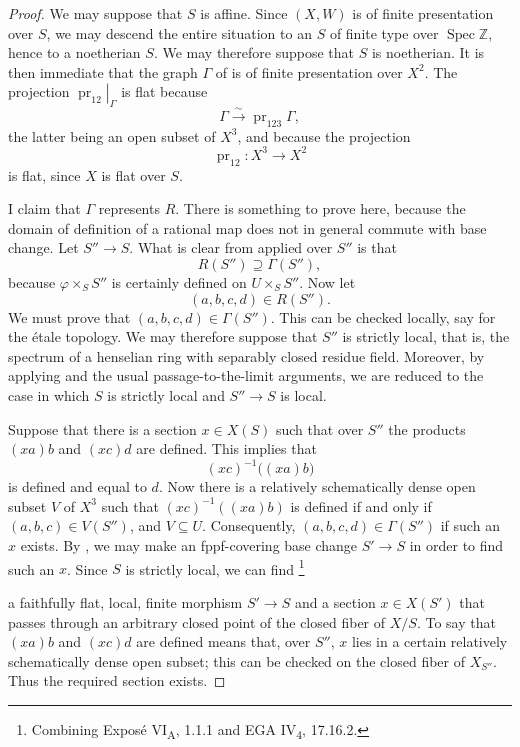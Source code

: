 \begin{proof}
We may suppose that \(S\) is affine. Since \((X,W)\) is of finite
presentation over \(S\), we may descend the entire situation to an
\(S\) of finite type over \(\operatorname{Spec}\mathbb Z\), hence
to a noetherian \(S\). We may therefore suppose that \(S\) is
noetherian. It is then immediate that the graph \(\Gamma\) of
 is of finite presentation over \(X^2\). The projection
\(\left.\operatorname{pr}_{12}\right|_\Gamma\) is flat because
\[
  \Gamma\xrightarrow{\sim}\operatorname{pr}_{123}\Gamma,
\]
the latter being an open subset of \(X^3\), and because the
projection
\[
  \operatorname{pr}_{12}\colon X^3\longrightarrow X^2
\]
is flat, since \(X\) is flat over \(S\).

I claim that \(\Gamma\) represents \(R\). There is something to
prove here, because the domain of definition of a rational map
does not in general commute with base change. Let \(S''\to S\).
What is clear from  applied over \(S''\) is that
\[
  R(S'')\supseteq\Gamma(S''),
\]
because \(\varphi\times_S S''\) is certainly defined on
\(U\times_S S''\). Now let
\[
  (a,b,c,d)\in R(S'').
\]
We must prove that \((a,b,c,d)\in\Gamma(S'')\). This can be
checked locally, say for the étale topology. We may therefore
suppose that \(S''\) is strictly local, that is, the spectrum of a
henselian ring with separably closed residue field. Moreover, by
applying  and the usual passage-to-the-limit arguments, we are
reduced to the case in which \(S\) is strictly local and
\(S''\to S\) is local.

Suppose that there is a section \(x\in X(S)\) such that over
\(S''\) the products \((xa)b\) and \((xc)d\) are defined. This
implies that
\[
  (xc)^{-1}\bigl((xa)b\bigr)
\]
is defined and equal to \(d\). Now there is a relatively
schematically dense open subset \(V\) of \(X^3\) such that
\((xc)^{-1}((xa)b)\) is defined if and only if
\((a,b,c)\in V(S'')\), and \(V\subseteq U\). Consequently,
\((a,b,c,d)\in\Gamma(S'')\) if such an \(x\) exists. By , we
may make an fppf-covering base change \(S'\to S\) in order to find
such an \(x\). Since \(S\) is strictly local, we can
find\begingroup
\renewcommand{\thefootnote}{*}\footnote{Combining Exposé
VI\textsubscript{A}, 1.1.1 and EGA IV\textsubscript{4}, 17.16.2.}
\addtocounter{footnote}{-1}
\endgroup{} a faithfully flat, local, finite morphism
\(S'\to S\) and a section \(x\in X(S')\) that passes through an
arbitrary closed point of the closed fiber of \(X/S\). To say
that \((xa)b\) and \((xc)d\) are defined means that, over
\(S''\), \(x\) lies in a certain relatively schematically dense
open subset; this can be checked on the closed fiber of
\(X_{S''}\). Thus the required section exists.
\end{proof}

